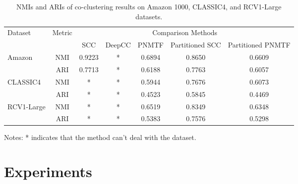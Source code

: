 \begin{table*}[htbp]
    \centering
    \caption{NMIs and ARIs of co-clustering results on Amazon 1000, CLASSIC4, and RCV1-Large datasets.}
    \label{tab:evaluation-metrics}
    \begin{tabular}{@{} l c ccccc @{}}
        \toprule
        \multirow{2}{*}{Dataset}    & \multirow{2}{*}{Metric} & \multicolumn{5}{c}{Comparison Methods}                                                         \\
        \cmidrule{3-7}
                                    &                         & SCC                                    & DeepCC & PNMTF  & Partitioned SCC & Partitioned PNMTF \\
        \midrule
        \multirow{2}{*}{Amazon}     & NMI                     & 0.9223                                 & *      & 0.6894 & 0.8650          & 0.6609            \\
                                    & ARI                     & 0.7713                                 & *      & 0.6188 & 0.7763          & 0.6057            \\
        \multirow{2}{*}{CLASSIC4}   & NMI                     & *                                      & *      & 0.5944 & 0.7676          & 0.6073            \\
                                    & ARI                     & *                                      & *      & 0.4523 & 0.5845          & 0.4469            \\
        \multirow{2}{*}{RCV1-Large} & NMI                     & *                                      & *      & 0.6519 & 0.8349          & 0.6348            \\
                                    & ARI                     & *                                      & *      & 0.5383 & 0.7576          & 0.5298            \\
        \bottomrule
    \end{tabular}
    \begin{tablenotes}
        \small
        \item Notes: * indicates that the method can't deal with the dataset.
    \end{tablenotes}
\end{table*}
\section{Experiments}
\label{sec:experiment}

